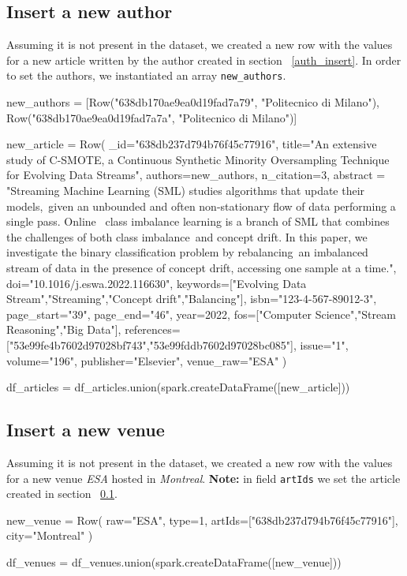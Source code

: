 \documentclass{Configuration_Files/PoliMi3i_thesis}
\begin{document}
\subsection{Insert a new author}
\label{pub_insert}
Assuming it is not present in the dataset, we created a new row with the values for a new article written by the author created
in section ~\ref{auth_insert}. In order to set the authors, we instantiated an array \verb |new_authors|.\newline
\begin{python}
new_authors =  [Row("638db170ae9ea0d19fad7a79", "Politecnico di Milano"), Row("638db170ae9ea0d19fad7a7a", "Politecnico di Milano")]

new_article = Row(
    _id="638db237d794b76f45c77916",
    title="An extensive study of C-SMOTE, a Continuous Synthetic Minority Oversampling Technique for Evolving Data Streams",
    authors=new_authors,
    n_citation=3,
    abstract = "Streaming Machine Learning (SML) studies algorithms that update their models,\
        given an unbounded and often non-stationary flow of data performing a single pass. Online \
        class imbalance learning is a branch of SML that combines the challenges of both class imbalance\
        and concept drift. In this paper, we investigate the binary classification problem by rebalancing\
        an imbalanced stream of data in the presence of concept drift, accessing one sample at a time.",
        doi="10.1016/j.eswa.2022.116630",
    keywords=["Evolving Data Stream","Streaming","Concept drift","Balancing"],
    isbn="123-4-567-89012-3",
    page_start="39",
    page_end="46",
    year=2022,
    fos=["Computer Science","Stream Reasoning","Big Data"],
    references=["53e99fe4b7602d97028bf743","53e99fddb7602d97028bc085"],
    issue="1",
    volume="196",
    publisher="Elsevier",
    venue_raw="ESA"
)

df_articles = df_articles.union(spark.createDataFrame([new_article]))
\end{python}

\subsection{Insert a new venue}
Assuming it is not present in the dataset, we created a new row with the values for a new venue \emph{ESA} hosted in
\emph{Montreal}.\newline
\textbf{Note:} in field \verb |artIds| we set the article created in section ~\ref{pub_insert}.\newline
\begin{python}
new_venue = Row(
    raw="ESA",
    type=1,
    artIds=["638db237d794b76f45c77916"],
    city="Montreal"
)

df_venues = df_venues.union(spark.createDataFrame([new_venue]))
\end{python}
\end{document}
